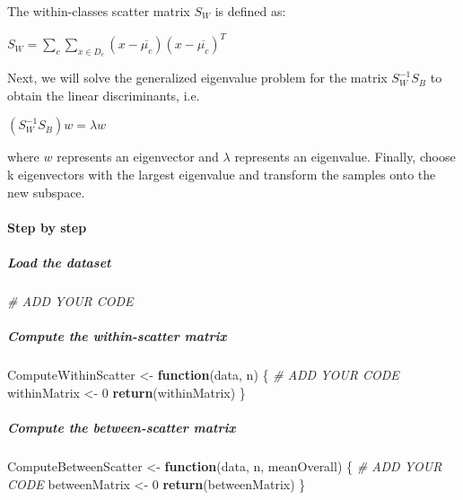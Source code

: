\documentclass[]{article}
\newenvironment{Shaded}{\begin{snugshade}}{\end{snugshade}}
\newcommand{\CommentTok}[1]{\textcolor[rgb]{0.56,0.35,0.01}{\textit{#1}}}
\newcommand{\ControlFlowTok}[1]{\textcolor[rgb]{0.13,0.29,0.53}{\textbf{#1}}}
\newcommand{\DecValTok}[1]{\textcolor[rgb]{0.00,0.00,0.81}{#1}}
\newcommand{\KeywordTok}[1]{\textcolor[rgb]{0.13,0.29,0.53}{\textbf{#1}}}
\newcommand{\NormalTok}[1]{#1}
\newcommand{\StringTok}[1]{\textcolor[rgb]{0.31,0.60,0.02}{#1}}
\let\oldparagraph\paragraph
\renewcommand{\paragraph}[1]{\oldparagraph{#1}\mbox{}}
\let\oldsubparagraph\subparagraph
\renewcommand{\subparagraph}[1]{\oldsubparagraph{#1}\mbox{}}
\begin{document}
The within-classes scatter matrix \(S_W\) is defined as:

\(S_W = \sum_c \sum_{x \in D_c}(x - \overline{\mu_c})(x - \overline{\mu_c})^T\)

Next, we will solve the generalized eigenvalue problem for the matrix
\(S_W^{-1}S_B\) to obtain the linear discriminants, i.e.

\((S_W^{-1}S_B)w = \lambda w\)

where \(w\) represents an eigenvector and \(\lambda\) represents an
eigenvalue. Finally, choose k eigenvectors with the largest eigenvalue
and transform the samples onto the new subspace.

\hypertarget{step-by-step}{%
\paragraph{Step by step}\label{step-by-step}}

\hypertarget{load-the-dataset}{%
\subparagraph{Load the dataset}\label{load-the-dataset}}

\begin{Shaded}
\begin{Highlighting}[]
\CommentTok{# ADD YOUR CODE}
\end{Highlighting}
\end{Shaded}

\hypertarget{compute-the-within-scatter-matrix}{%
\subparagraph{Compute the within-scatter
matrix}\label{compute-the-within-scatter-matrix}}

\begin{Shaded}
\begin{Highlighting}[]
\NormalTok{ComputeWithinScatter <-}\StringTok{ }\ControlFlowTok{function}\NormalTok{(data, n)}
\NormalTok{\{}
  \CommentTok{# ADD YOUR CODE}
\NormalTok{  withinMatrix <-}\StringTok{ }\DecValTok{0}
  \KeywordTok{return}\NormalTok{(withinMatrix)}
\NormalTok{\}}
\end{Highlighting}
\end{Shaded}

\hypertarget{compute-the-between-scatter-matrix}{%
\subparagraph{Compute the between-scatter
matrix}\label{compute-the-between-scatter-matrix}}

\begin{Shaded}
\begin{Highlighting}[]
\NormalTok{ComputeBetweenScatter <-}\StringTok{ }\ControlFlowTok{function}\NormalTok{(data, n, meanOverall)}
\NormalTok{\{}
  \CommentTok{# ADD YOUR CODE}
\NormalTok{  betweenMatrix <-}\StringTok{ }\DecValTok{0}
  \KeywordTok{return}\NormalTok{(betweenMatrix)}
\NormalTok{\}}
\end{Highlighting}
\end{Shaded}
\end{document}
